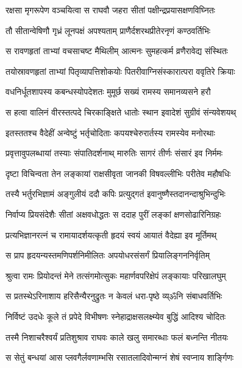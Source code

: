 \twolineshloka
{रक्षसा मृगरूपेण वञ्चयित्वा स राघवौ}
{जहरा सीतां पक्षीन्द्रप्रयासक्षणविघ्नितः}%

\twolineshloka
{तौ सीतान्वेषिणौ गृध्रं लूनपक्षं अपश्यताम्}
{प्राणैर्दशरथप्रीतेरनृणं कण्ठवर्तिभिः}%

\twolineshloka
{स रावणहृतां ताभ्यां वचसाचष्ट मैथिलीम्}
{आत्मनः सुमहत्कर्म व्रणैरावेद्य संस्थितः}%

\twolineshloka
{तयोस्रावणहृतां ताभ्यां पितृव्यापत्तिशोकयोः}
{पितरीवाग्निसंस्कारात्परा ववृतिरे क्रियाः}%

\twolineshloka
{वधनिर्धूतशापस्य कबन्धस्योपदेशतः}
{मुमूर्छ सख्यं रामस्य समानव्यसने हरौ}%

\twolineshloka
{स हत्वा वालिनं वीरस्तत्पदे चिरकाङ्क्षिते}
{धातोः स्थान इवादेशं सुग्रीवं संन्यवेशयथ्}%

\twolineshloka
{इतस्ततश्च वैदेहीं अन्वेष्टुं भर्तृचोदिताः}
{कपयश्चेरुरार्तस्य रामस्येव मनोरथाः}%

\twolineshloka
{प्रवृत्तावुपलब्धायां तस्याः संपातिदर्शनाथ्}
{मारुतिः सागरं तीर्णः संसारं इव निर्ममः}%

\twolineshloka
{दृष्टा विचिन्वता तेन लङ्कायां राक्षसीवृता}
{जानकी विषवल्लीभिः परीतेव महौषधिः}%

\twolineshloka
{तस्यै भर्तुरभिज्ञामं अङ्गुलीयं ददौ कपिः}
{प्रत्युद्गतं इवानुष्णैस्तदानन्दाश्रुभिन्दुभिः}%

\twolineshloka
{निर्वाप्य प्रियसंदेशैः सीतां अक्षवधोद्धतः}
{स ददाह पुरीं लङ्कां क्षणसोढारिनिग्रहः}%

\twolineshloka
{प्रत्यभिज्ञानरत्नं च रामायादर्शयत्कृती}
{हृदयं स्वयं आयातं वैदेह्या इव मूर्तिमथ्}%

\twolineshloka
{स प्राप हृदयन्यस्तमणिपर्शनिमीलितः}
{अपयोधरसंसर्गं प्रियालिङ्गननिर्वृतिम्}%

\twolineshloka
{श्रुत्वा रामः प्रियोदन्तं मेने तत्संगमोत्सुकः}
{महार्णवपरिक्षेपं लङ्कायाः परिखालघुम्}%

\twolineshloka
{स प्रतस्थेऽरिनाशाय हरिसैन्यैरनुद्रुतः}
{न केवलं धरा-पृष्ठे व्य्ॐनि संबाधवर्तिभिः}%

\twolineshloka
{निर्विष्टं उदधेः कूले तं प्रपेदे विभीषणः}
{स्नेहाद्राक्षसलक्ष्म्येव बुद्धिं आदिश्य चोदितः}%

\twolineshloka
{तस्मै निशाचरैश्वर्यं प्रतिशुश्राव राघवः}
{काले खलु समारब्धाः फलं बध्नन्ति नीतयः}%

\twolineshloka
{स सेतुं बन्धयां आस प्लवगैर्लवणाम्भसि}
{रसातलादिवोन्मग्नं शेषं स्वप्नाय शार्ङ्गिणः}%

